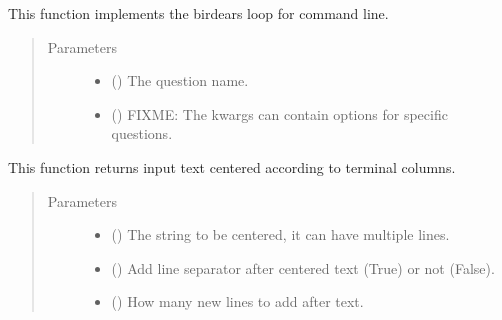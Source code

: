 \documentclass[letterpaper,10pt,english]{sphinxmanual}
\begin{document}
\begin{fulllineitems}
\label{\detokenize{birdears.interfaces:birdears.interfaces.commandline.CommandLine}}
This function implements the birdears loop for command line.
\begin{quote}\begin{description}
\item[{Parameters}] \leavevmode\begin{itemize}
\item {} 
 () \textendash{} The question name.

\item {} 
 () \textendash{} FIXME: The kwargs can contain options for specific
questions.

\end{itemize}

\end{description}\end{quote}

\end{fulllineitems}


\begin{fulllineitems}
\label{\detokenize{birdears.interfaces:birdears.interfaces.commandline.center_text}}
This function returns input text centered according to terminal columns.
\begin{quote}\begin{description}
\item[{Parameters}] \leavevmode\begin{itemize}
\item {} 
 () \textendash{} The string to be centered, it can have multiple lines.

\item {} 
 () \textendash{} Add line separator after centered text (True) or
not (False).

\item {} 
 () \textendash{} How many new lines to add after text.

\end{itemize}

\end{description}\end{quote}

\end{fulllineitems}
\end{document}
